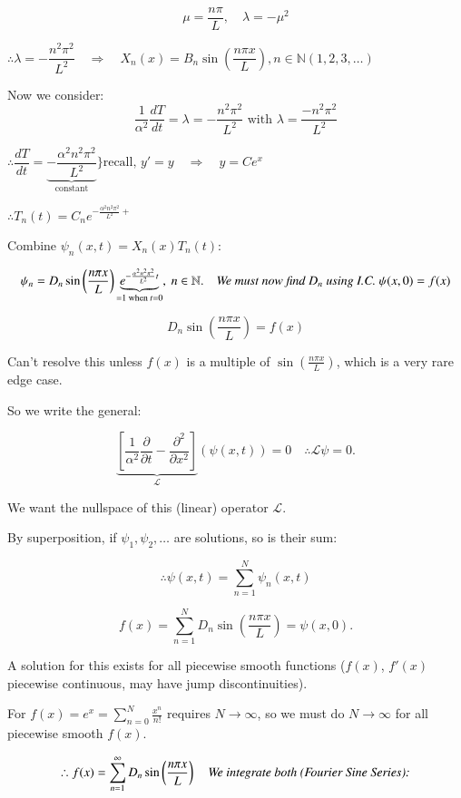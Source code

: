\documentclass{report}
\begin{document}
$$
\mu=\dfrac{n\pi}{L},\quad \lambda=-\mu^2
$$

$\therefore \lambda=-\dfrac{n^2\pi^2}{L^2}\quad\Rightarrow\quad X_n(x)=B_n\sin\left(\dfrac{n\pi x}{L}\right), n\in\mathbb{N}(1,2,3,\ldots)$

Now we consider:
$$
\frac{1}{\alpha^2} \frac{dT}{dt} = \lambda = -\frac{n^2 \pi^2}{L^2} \text{ with } \lambda=\dfrac{-n^2\pi^2}{L^2}
$$

$\therefore \dfrac{dT}{dt}=\left.\underbrace{-\dfrac{\alpha^2n^2\pi^2}{L^2}}_{\text{constant}}\right.\}\text{recall, } y'=y\quad \Rightarrow\quad y=Ce^x$

$\therefore T_n(t)=C_ne^{-\frac{\alpha^2n^2\pi^2}{L^2}+}$


Combine $\psi_n(x, t) = X_n(x) T_n(t)$:

$$
\psi_n = D_n \sin\left(\frac{n \pi x}{L}\right) \underbrace{e^{-\frac{\alpha^2 n^2 \pi^2}{L^2} t}}_{=1\text{ when }t=0}, \ n \in \mathbb{N}.\quad \text{\textit{We must now find $D_n$ using I.C. $\psi(x, 0) = f(x)$}}
$$

$$
D_n\sin\left(\dfrac{n\pi x}{L}\right)=f(x)
$$

Can't resolve this unless $f(x)$ is a multiple of $\sin\left(\frac{n \pi x}{L}\right)$, which is a very rare edge case.

So we write the general:

$$
\underbrace{\left[\frac{1}{\alpha^2} \frac{\partial}{\partial t} - \frac{\partial^2}{\partial x^2}\right]}_{\mathcal{L}} (\psi(x, t)) = 0\quad \therefore \mathcal{L}\psi = 0.
$$

We want the nullspace of this (linear) operator $\mathcal{L}$.

By superposition, if $\psi_1, \psi_2, \dots$ are solutions, so is their sum:

$$
\therefore \psi(x, t) = \sum\limits_{n=1}^N \psi_n(x, t)
$$

$$
f(x) = \sum\limits_{n=1}^N D_n \sin\left(\dfrac{n \pi x}{L}\right) = \psi(x, 0).
$$

A solution for this exists for all piecewise smooth functions ($f(x)$, $f'(x)$ piecewise continuous, may have jump discontinuities).

For $f(x) = e^{x} =\sum\limits_{n=0}^N \frac{x^n}{n!}$ requires $N \to \infty$, so we must do $N \to \infty$ for all piecewise smooth $f(x)$.

$$
\therefore f(x) = \sum\limits_{n=1}^\infty D_n \sin\left(\dfrac{n \pi x}{L}\right)\quad \text{\textit{We integrate both (Fourier Sine Series):}}
$$
\end{document}
